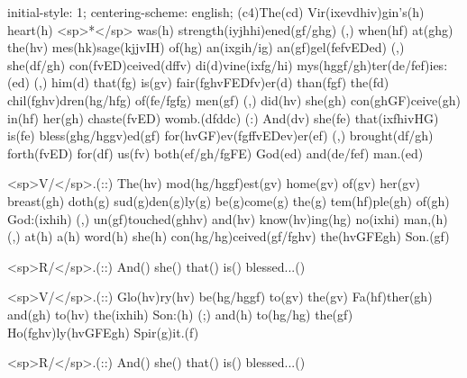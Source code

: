 initial-style: 1;
centering-scheme: english;
(c4)The(cd) Vir(ixevdhiv)gin's(h) heart(h) <sp>*</sp> was(h) strength(iyjhhi)ened(gf/ghg) (,) when(hf) at(ghg) the(hv) mes(hk)sage(kjjvIH) of(hg) an(ixgih/ig) an(gf)gel(fefvEDed) (,) she(df/gh) con(fvED)ceived(dffv) di(d)vine(ixfg/hi) mys(hggf/gh)ter(de/fef)ies:(ed) (,) him(d) that(fg) is(gv) fair(fghvFEDfv)er(d) than(fgf) the(fd) chil(fghv)dren(hg/hfg) of(fe/fgfg) men(gf) (,) did(hv) she(gh) con(ghGF)ceive(gh) in(hf) her(gh) chaste(fvED) womb.(dfddc) (:) And(dv) she(fe) that(ixfhivHG) is(fe) bless(ghg/hggv)ed(gf) for(hvGF)ev(fgffvEDev)er(ef) (,) brought(df/gh) forth(fvED) for(df) us(fv) both(ef/gh/fgFE) God(ed) and(de/fef) man.(ed)

<sp>V/</sp>.(::) The(hv) mod(hg/hggf)est(gv) home(gv) of(gv) her(gv) breast(gh) doth(g) sud(g)den(g)ly(g) be(g)come(g) the(g) tem(hf)ple(gh) of(gh) God:(ixhih) (,) un(gf)touched(ghhv) and(hv) know(hv)ing(hg) no(ixhi) man,(h) (,) at(h) a(h) word(h) she(h) con(hg/hg)ceived(gf/fghv) the(hvGFEgh) Son.(gf)

<sp>R/</sp>.(::) And() she() that() is() blessed...()

<sp>V/</sp>.(::) Glo(hv)ry(hv) be(hg/hggf) to(gv) the(gv) Fa(hf)ther(gh) and(gh) to(hv) the(ixhih) Son:(h) (;) and(h) to(hg/hg) the(gf) Ho(fghv)ly(hvGFEgh) Spir(g)it.(f)

<sp>R/</sp>.(::) And() she() that() is() blessed...()